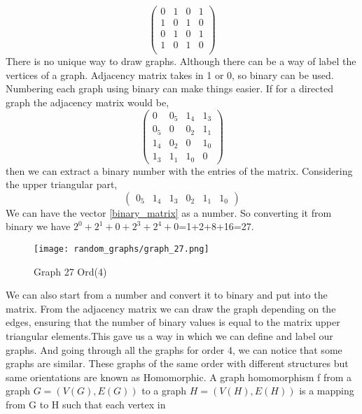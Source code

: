\documentclass[15pt, a4paper]{Assignment}
\begin{document}
\begin{equation}
\begin{pmatrix}
0& 1& 0& 1\\
1 & 0 & 1 & 0\\
0 & 1 & 0 & 1\\
1 & 0 & 1 & 0\\
\end{pmatrix}	
\end{equation}
\newline
\newline
There is no unique way to draw graphs.
Although there can be a way of label the vertices of a graph.
Adjacency matrix takes in 1 or 0, so binary can be used.
Numbering each graph using binary can make things easier.
If for a directed graph the adjacency matrix would be,\begin{equation}
	\begin{pmatrix}
		0&0_5&1_4&1_3\\
		0_5&0&0_2&1_1\\
		1_4&0_2&0&1_0\\	
		1_3&1_1&1_0&0
	\end{pmatrix}\label{adj_mat}
\end{equation}
then we can extract a binary number with the entries of the matrix.
Considering the upper triangular part,
\begin{equation}
	\begin{pmatrix}
		0_5&1_4&1_3&0_2&1_1&1_0
	\end{pmatrix}\label{binary_matrix}
\end{equation}
We can have the vector \ref{binary_matrix} as a number.
So converting it from binary we have $2^0+2^1+0+2^3+2^4+0$=1+2+8+16=27.
\begin{figure}[H]
	\centering
	\texttt{[image: random\_graphs/graph\_27.png]}
	\caption{Graph 27 Ord(4)}
	\label{graph 27}
\end{figure}
We can also start from a number and convert it to binary and put into the matrix.
From the adjacency matrix we can draw the graph depending on the edges, ensuring that the number of binary values is equal to the matrix upper triangular elements.This gave us a way in which we can define and label our graphs. 
And going through all the graphs for order 4, we can notice that some graphs are similar.
These graphs of the same order with different structures but same orientations are known as Homomorphic. 
A graph homomorphism f from a graph $G = (V(G),E(G))$ to a graph $H =(V(H),E(H))$
is a mapping from G to H such that each vertex in
\end{document}
